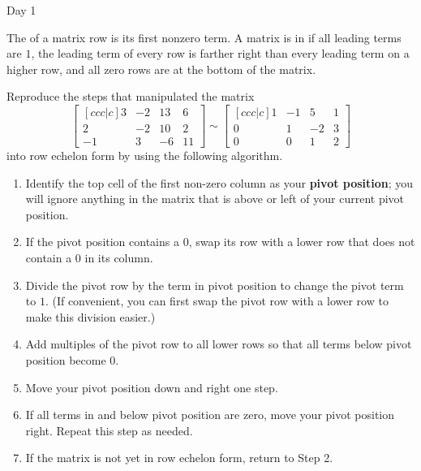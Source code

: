 \begin{applicationActivities}{Day 1}
\begin{definition}
  The  of a matrix row is its first nonzero term.
  A matrix is in  if all leading terms are \(1\),
  the leading term of every row
  is farther right than every leading term on a higher row, and all zero
  rows are at the bottom of the matrix.
\end{definition}

\begin{activity}{0}
  Reproduce the steps that manipulated the matrix
  \[
    \begin{bmatrix}[ccc|c]
      3 & -2 & 13 & 6 \\
      2 & -2 & 10 & 2 \\
      -1 & 3 & -6 & 11
    \end{bmatrix}\sim
    \begin{bmatrix}[ccc|c]
      1 & -1 &  5 & 1 \\
      0 &  1 & -2 & 3 \\
      0 &  0 &  1 & 2
    \end{bmatrix}
  \]
  into row echelon form by using the following algorithm.
  \begin{multicols}{2}\noindent
  \begin{enumerate}
    \item Identify
    the top cell of the first non-zero column as your \textbf{pivot position};
    you will ignore anything in the matrix that is above or left of your
    current pivot position.
    \item If the pivot position contains a \(0\), swap its row with a lower
          row that does not contain a \(0\) in its column.
    \item Divide the pivot row by the term in pivot position to change the
          pivot term to \(1\). (If convenient, you can first swap the
          pivot row with a lower row to make this division easier.)
    \item Add multiples of the pivot row to all lower rows so that all terms
          below pivot position become \(0\).
    \item Move your pivot position down and right one step.
    \item If all terms in and below pivot position are zero, move your
          pivot position right. Repeat this step as needed.
    \item If the matrix is not yet in row echelon form, return to Step 2.
  \end{enumerate}
  \end{multicols}
\end{activity}


\end{applicationActivities}
